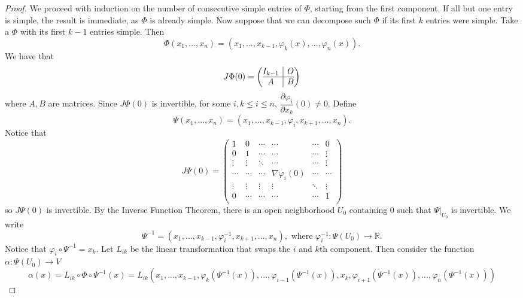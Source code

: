 \documentclass{article}
\theoremstyle{plain} %
\numberwithin{thm}{section} %
\theoremstyle{definition}
\begin{document}
\begin{proof}
        We proceed with induction on the number of consecutive simple entries of \(\Phi\), starting from the first component. If all but one entry is simple, the result is immediate, as \(\Phi\) is already simple. Now suppose that we can decompose such \(\Phi\) if its first \(k\) entries were simple. Take a \(\Phi\) with its first \(k-1\) entries simple. Then 
        \[
            \Phi (x_1, ..., x_n) = (x_1, ..., x_{k-1}, \varphi _k (x), ..., \varphi _n (x)).
        \]
        We have that
        \[
            J \Phi (0) = \left( \begin{array}{@{}c|c@{}}
                I_{k-1} & O \\
                \hline
                A & B
            \end{array} \right) 
        \]
        where \(A,B\) are matrices. Since \(J \Phi (0)\) is invertible, for some \(i, k \leq i \leq n\), \(\dfrac{\partial \varphi _i}{\partial x_k} (0) \neq 0\). Define
        \[
            \Psi (x_1, ..., x_n) = (x_1, ..., x_{k-1} , \varphi _i, x_{k+1} , ..., x_n).
        \]
        Notice that
        \[
            J \Psi (0) = \begin{pmatrix}
                1 & 0 & \cdots & \cdots & \cdots &  0 \\
                0 & 1 & \cdots & \cdots & \cdots &  \vdots \\
                \vdots & \vdots & \ddots & \cdots & \cdots &  \vdots \\
                \cdots & \cdots & \cdots & \nabla \varphi_i(0) & \cdots &  \cdots \\
                \vdots & \vdots & \vdots & \vdots & \ddots &  \vdots \\
                0 & \cdots & \cdots & \cdots & \cdots &  1 \\
            \end{pmatrix}
        \]
        so \(J \Psi(0)\) is invertible. By the Inverse Function Theorem, there is an open neighborhood \(U_0\) containing 0 such that \(\Psi | _{U_0}\) is invertible. We write
        \[
            \Psi^{-1} = (x_1, ..., x_{k-1} , \varphi _i^{-1} , x_{k+1} , ..., x_n), \text{ where } \varphi _i^{-1} : \Psi (U_0) \to \mathbb{R}.
        \]
        Notice that \(\varphi _i \circ \Psi^{-1} = x_k\). Let \(L_{ik}\) be the linear transformation that swaps the \(i\) and \(k\)th component. Then consider the function \(\alpha : \Psi (U_0) \to V\) 
        \[
            \alpha(x) = L_{ik} \circ \Phi \circ \Psi^{-1} (x) = L_{ik} (x_1, ..., x_{k-1} , \varphi _k (\Psi ^{-1}(x)), ..., \varphi _{i-1} (\Psi ^{-1}(x)), x_k, \varphi _{i+1} (\Psi ^{-1}(x)), ..., \varphi _n (\Psi ^{-1}(x)))
\]
\end{proof}
\end{document}

